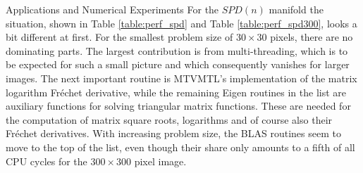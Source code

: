 \begin{chapter}{Applications and Numerical Experiments}
For the $SPD(n)$ manifold the situation, shown in Table \ref{table:perf_spd} and Table \ref{table:perf_spd300}, looks a bit different at first. 
For the smallest problem size of $30\times 30$ pixels, there are no dominating parts. The largest contribution is from multi-threading, which is to be expected 
for such a small picture and which consequently vanishes for larger images. 
The next important routine is MTVMTL's implementation of the matrix logarithm Fr\'{e}chet derivative, while the remaining Eigen routines in the
list are auxiliary functions for solving triangular matrix functions. These are needed for the computation of matrix square roots, logarithms and of course also their
Fr\'{e}chet derivatives. With increasing problem size, the BLAS routines seem to move to the top of the list, even though their share only amounts 
to a fifth of all CPU cycles for the $300\times 300$ pixel image. \\
\begin{figure}[h!]
    \centering
\end{figure}
\begin{table}[h!]
\centering
\footnotesize
\setlength{\tabcolsep}{3pt}
\end{table}
\end{chapter}
